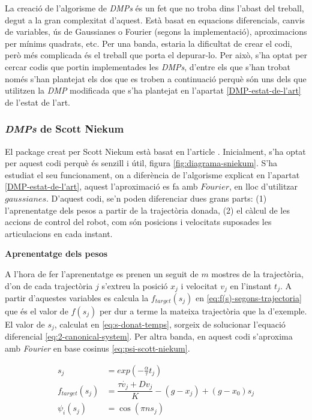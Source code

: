\documentclass[12pt,a4paper,final,twoside]{article}
\begin{document}
La creació de l'algorisme de \textit{DMPs} és un fet que no troba dins l'abast del treball, degut a la gran complexitat d'aquest. Està basat en equacions diferencials, canvis de variables, ús de Gaussianes o Fourier (segons la implementació), aproximacions per mínims quadrats, etc. Per una banda, estaria la dificultat de crear el codi, però més complicada és el treball que porta el depurar-lo. Per això, s'ha optat per cercar codis que portin implementades les \textit{DMPs}, d'entre els que s'han trobat només s'han plantejat els dos que es troben a continuació perquè són uns dels que utilitzen la \textit{DMP} modificada que s'ha plantejat en l'apartat \ref{DMP-estat-de-l'art} de l'estat de l'art.

\subsubsection{\textit{DMPs} de Scott Niekum}

El package creat per Scott Niekum està basat en l'article \cite{Pastor2009}. Inicialment, s'ha optat per aquest codi perquè és senzill i útil, figura \ref{fig:diagrama-sniekum}. S'ha estudiat el seu funcionament, on a diferència de l'algorisme explicat en l'apartat \ref{DMP-estat-de-l'art}, aquest l'aproximació es fa amb $Fourier$, en lloc d'utilitzar $gaussianes$. D'aquest codi, se'n poden diferenciar dues grans parts: (1) l'aprenentatge dels pesos a partir de la trajectòria donada, (2) el càlcul de les accions de control del robot, com són posicions i velocitats suposades les articulacions en cada instant.

\vspace{20pt}
\textbf{Aprenentatge dels pesos}

A l'hora de fer l'aprenentatge es prenen un seguit de $m$ mostres de la trajectòria, d'on de cada trajectòria $j$ s'extreu la posició $x_j$ i velocitat $v_j$ en l'instant $t_j$. A partir d'aquestes variables es calcula la $f_{target}(s_j)$ en \eqref{eq:f(s)-segons-trajectoria} que és el valor de $f(s_j)$ per dur a terme la mateixa trajectòria que la d'exemple. El valor de $s_j$, calculat en \eqref{eq:s-donat-temps}, sorgeix de solucionar l'equació diferencial \eqref{eq:2-canonical-system}. Per altra banda, en aquest codi s'aproxima amb \textit{Fourier} en base cosinus \eqref{eq:psi-scott-niekum}. 

\begin{align}
s_j &= exp(-\frac{\alpha}{\tau}  t_j)\label{eq:s-donat-temps}\\
f_{target}(s_j) &= \dfrac{\tau \dot{v_j} + D v_j}{K} - (g - x_j) + (g - x_0)s_j \label{eq:f(s)-segons-trajectoria} \\
\psi_i(s_j) &= \cos(\pi n s_j)\label{eq:psi-scott-niekum}
\end{align}
\end{document}
